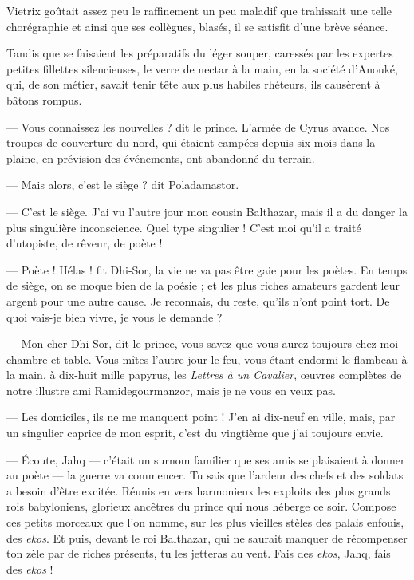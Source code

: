 \documentclass[a4paper, 11pt, oneside, polutonikogreek, french]{article}
\begin{document}
Vietrix goûtait assez peu le raffinement un peu maladif que trahissait une telle chorégraphie et ainsi que ses collègues, blasés, il se satisfit d'une brève séance.

\bigskip
\centerline{\EightStarTaper}
\centerline{\EightStarTaper\EightStarTaper}
\bigskip

Tandis que se faisaient les préparatifs du léger souper, caressés par les expertes petites fillettes silencieuses, le verre de nectar à la main, en la société d'Anouké, qui, de son métier, savait tenir tête aux plus habiles rhéteurs, ils causèrent à bâtons rompus.

--- Vous connaissez les nouvelles ? dit le prince. L'armée de Cyrus avance. Nos troupes de couverture du nord, qui étaient campées depuis six mois dans la plaine, en prévision des événements, ont abandonné du terrain.

--- Mais alors, c'est le siège ? dit Poladamastor.

--- C'est le siège. J'ai vu l'autre jour mon cousin Balthazar, mais il a du danger la plus singulière inconscience. Quel type singulier ! C'est moi qu'il a traité d'utopiste, de rêveur, de poète !

--- Poète ! Hélas ! fit Dhi-Sor, la vie ne va pas être gaie pour les poètes. En temps de siège, on se moque bien de la poésie ; et les plus riches amateurs gardent leur argent pour une autre cause. Je reconnais, du reste, qu'ils n'ont point tort. De quoi vais-je bien vivre, je vous le demande ?

--- Mon cher Dhi-Sor, dit le prince, vous savez que vous aurez toujours chez moi chambre et table. Vous mîtes l'autre jour le feu, vous étant endormi le flambeau à la main, à dix-huit mille papyrus, les \emph{Lettres à un Cavalier}, œuvres complètes de notre illustre ami Ramidegourmanzor, mais je ne vous en veux pas.

--- Les domiciles, ils ne me manquent point ! J'en ai dix-neuf en ville, mais, par un singulier caprice de mon esprit, c'est du vingtième que j'ai toujours envie.

--- Écoute, Jahq --- c'était un surnom familier que ses amis se plaisaient à donner au poète --- la guerre va commencer. Tu sais que l'ardeur des chefs et des soldats a besoin d'être excitée. Réunis en vers harmonieux les exploits des plus grands rois babyloniens, glorieux ancêtres du prince qui nous héberge ce soir. Compose ces petits morceaux que l'on nomme, sur les plus vieilles stèles des palais enfouis, des \emph{ekos}. Et puis, devant le roi Balthazar, qui ne saurait manquer de récompenser ton zèle par de riches présents, tu les jetteras au vent. Fais des \emph{ekos}, Jahq, fais des \emph{ekos} !
\end{document}
